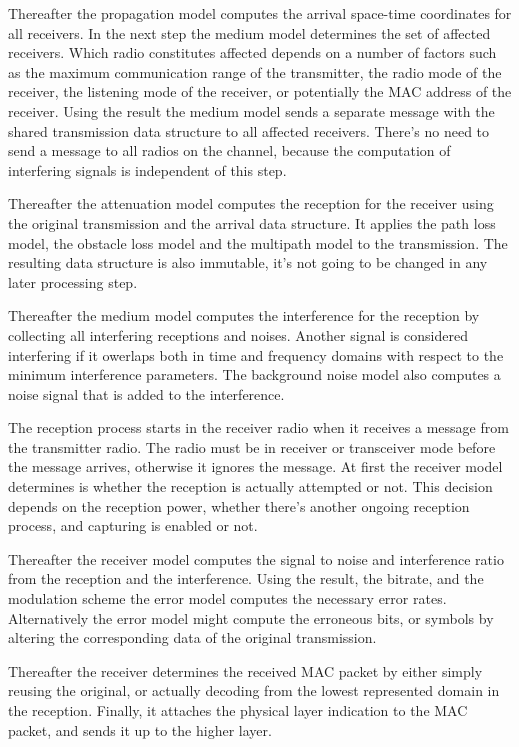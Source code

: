 Thereafter the propagation model computes the arrival space-time coordinates for
all receivers. In the next step the medium model determines the set of affected
receivers. Which radio constitutes affected depends on a number of factors such
as the maximum communication range of the transmitter, the radio mode of the
receiver, the listening mode of the receiver, or potentially the MAC address of
the receiver. Using the result the medium model sends a separate message with
the shared transmission data structure to all affected receivers. There's no
need to send a message to all radios on the channel, because the computation
of interfering signals is independent of this step.

Thereafter the attenuation model computes the reception for the receiver using
the original transmission and the arrival data structure. It applies the path
loss model, the obstacle loss model and the multipath model to the transmission.
The resulting data structure is also immutable, it's not going to be changed in
any later processing step.

Thereafter the medium model computes the interference for the reception by
collecting all interfering receptions and noises. Another signal is considered
interfering if it owerlaps both in time and frequency domains with respect to 
the minimum interference parameters. The background noise model also computes a 
noise signal that is added to the interference.

The reception process starts in the receiver radio when it receives a message
from the transmitter radio. The radio must be in receiver or transceiver mode
before the message arrives, otherwise it ignores the message. At first the
receiver model determines is whether the reception is actually attempted or not.
This decision depends on the reception power, whether there's another ongoing
reception process, and capturing is enabled or not.

Thereafter the receiver model computes the signal to noise and interference
ratio from the reception and the interference. Using the result, the bitrate,
and the modulation scheme the error model computes the necessary error rates.
Alternatively the error model might compute the erroneous bits, or symbols by
altering the corresponding data of the original transmission. 

Thereafter the receiver determines the received MAC packet by either simply
reusing the original, or actually decoding from the lowest represented domain
in the reception. Finally, it attaches the physical layer indication to the MAC
packet, and sends it up to the higher layer.


